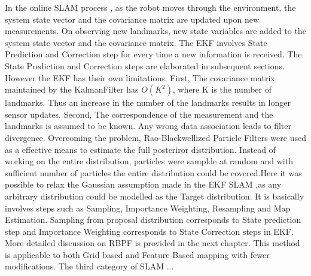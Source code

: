 In the online SLAM process , as the robot moves through the environment, the system state vector and the covariance matrix are updated upon new measurements. 
On observing new landmarks, new state variables are added to the system state vector and the covariance matrix. The EKF involves State Prediction and Correction step for every time a new information is received.
The State Prediction and Correction steps are elaborated in subsequent sections.
However the EKF has their own limitations. First, The covariance matrix maintained by the KalmanFilter has ${O}(K^2)$, 
where K is the number of landmarks. Thus an increase in the number of the landmarks results in longer sensor updates. Second, The correspondence of the measurement and the landmarks is assumed to be known. Any wrong data association leads to 
filter divergence.  
Overcoming the problem, Rao-Blackwellized Particle Filters were used as a effective means to estimate the full posteriror distribution. Instead of working on the entire distribution, particles were samplde at random and with 
sufficient number of particles the entire distribution could be covered.Here it was possible to relax the Gaussian assumption made in the EKF SLAM ,as any 
arbitrary distribution could be modelled as the Target distribution. It is basically involves steps such as Sampling, Importance Weighting, Resampling and Map Estimation.
Sampling from proposal distribution corresponds to State prediction step and Importance Weighting corresponds to State Correction steps in EKF.
More detailed discussion on RBPF is provided in the next chapter. This method is applicable to both Grid based and Feature Based mapping with fewer modifications.
The third category of SLAM ...


